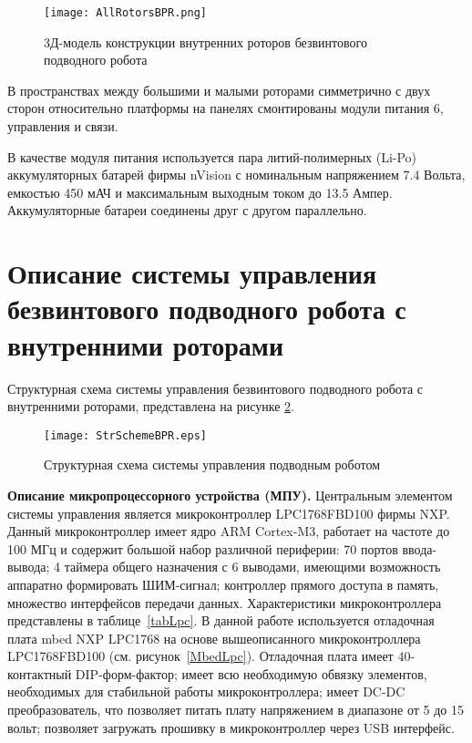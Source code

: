 \begin{figure}[h]
	\centering
	\texttt{[image: AllRotorsBPR.png]}%
	\caption{3Д-модель конструкции внутренних роторов безвинтового подводного робота}
	\label{AllRotorsBPR}
\end{figure}



В пространствах между большими и малыми роторами симметрично с двух сторон относительно платформы на панелях смонтированы модули питания 6, управления и связи.

В качестве модуля питания используется пара литий-полимерных (Li-Po) аккумуляторных батарей фирмы nVision %
с номинальным напряжением 7.4 Вольта, емкостью 450 мАЧ и максимальным выходным током до 13.5 Ампер. Аккумуляторные батареи соединены друг с другом параллельно.





\section{Описание системы управления безвинтового подводного робота с внутренними роторами}

Структурная схема системы управления безвинтового подводного робота с внутренними роторами, представлена на рисунке \ref{str_scheme}.

\begin{figure}[h!]
	\begin{center}
		\texttt{[image: StrSchemeBPR.eps]}
		\caption{Структурная схема системы управления подводным роботом} \label{str_scheme}
	\end{center}
\end{figure}


\textbf{Описание микропроцессорного устройства (МПУ).} Центральным элементом системы управления является микроконтроллер LPC1768FBD100 фирмы NXP. Данный микроконтроллер имеет ядро ARM Cortex-M3, работает на частоте до 100 МГц и содержит большой набор различной периферии: 70 портов ввода-вывода; 4 таймера общего назначения с 6 выводами, имеющими возможность аппаратно формировать ШИМ-сигнал; контроллер прямого доступа в память, множество интерфейсов передачи данных. Характеристики микроконтроллера представлены в таблице~\ref{tabLpc}. В данной работе используется отладочная плата mbed NXP LPC1768 на основе вышеописанного микроконтроллера LPC1768FBD100 (см. рисунок~\ref{MbedLpc}).  Отладочная плата имеет 40-контактный DIP-форм-фактор; имеет всю необходимую обвязку элементов, необходимых для стабильной работы микроконтроллера; имеет DC-DC преобразователь, что позволяет питать плату напряжением в диапазоне от 5 до 15 вольт; позволяет загружать прошивку в микроконтроллер через USB интерфейс.

